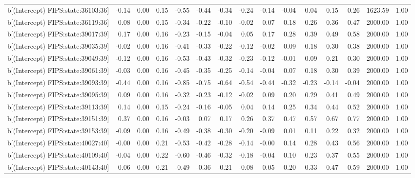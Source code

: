 \begin{table}[ht]
\begin{tabular}{rrrrrrrrrrrrrrr}
  b[(Intercept) FIPS:state:36103:36] & -0.14 & 0.00 & 0.15 & -0.55 & -0.44 & -0.34 & -0.24 & -0.14 & -0.04 & 0.04 & 0.15 & 0.26 & 1623.59 & 1.00 \\ 
  b[(Intercept) FIPS:state:36119:36] & 0.08 & 0.00 & 0.15 & -0.34 & -0.22 & -0.10 & -0.02 & 0.07 & 0.18 & 0.26 & 0.36 & 0.47 & 2000.00 & 1.00 \\ 
  b[(Intercept) FIPS:state:39017:39] & 0.17 & 0.00 & 0.16 & -0.23 & -0.15 & -0.04 & 0.05 & 0.17 & 0.28 & 0.39 & 0.49 & 0.58 & 2000.00 & 1.00 \\ 
  b[(Intercept) FIPS:state:39035:39] & -0.02 & 0.00 & 0.16 & -0.41 & -0.33 & -0.22 & -0.12 & -0.02 & 0.09 & 0.18 & 0.30 & 0.38 & 2000.00 & 1.00 \\ 
  b[(Intercept) FIPS:state:39049:39] & -0.12 & 0.00 & 0.16 & -0.53 & -0.43 & -0.32 & -0.23 & -0.12 & -0.01 & 0.09 & 0.21 & 0.30 & 2000.00 & 1.00 \\ 
  b[(Intercept) FIPS:state:39061:39] & -0.03 & 0.00 & 0.16 & -0.45 & -0.35 & -0.25 & -0.14 & -0.04 & 0.07 & 0.18 & 0.30 & 0.39 & 2000.00 & 1.00 \\ 
  b[(Intercept) FIPS:state:39093:39] & -0.44 & 0.00 & 0.16 & -0.85 & -0.75 & -0.64 & -0.54 & -0.44 & -0.32 & -0.23 & -0.14 & -0.04 & 2000.00 & 1.00 \\ 
  b[(Intercept) FIPS:state:39095:39] & 0.09 & 0.00 & 0.16 & -0.32 & -0.23 & -0.12 & -0.02 & 0.09 & 0.20 & 0.29 & 0.41 & 0.49 & 2000.00 & 1.00 \\ 
  b[(Intercept) FIPS:state:39113:39] & 0.14 & 0.00 & 0.15 & -0.24 & -0.16 & -0.05 & 0.04 & 0.14 & 0.25 & 0.34 & 0.44 & 0.52 & 2000.00 & 1.00 \\ 
  b[(Intercept) FIPS:state:39151:39] & 0.37 & 0.00 & 0.16 & -0.03 & 0.07 & 0.17 & 0.26 & 0.37 & 0.47 & 0.57 & 0.67 & 0.77 & 2000.00 & 1.00 \\ 
  b[(Intercept) FIPS:state:39153:39] & -0.09 & 0.00 & 0.16 & -0.49 & -0.38 & -0.30 & -0.20 & -0.09 & 0.01 & 0.11 & 0.22 & 0.32 & 2000.00 & 1.00 \\ 
  b[(Intercept) FIPS:state:40027:40] & -0.00 & 0.00 & 0.21 & -0.53 & -0.42 & -0.28 & -0.14 & -0.00 & 0.14 & 0.28 & 0.43 & 0.56 & 2000.00 & 1.00 \\ 
  b[(Intercept) FIPS:state:40109:40] & -0.04 & 0.00 & 0.22 & -0.60 & -0.46 & -0.32 & -0.18 & -0.04 & 0.10 & 0.23 & 0.37 & 0.55 & 2000.00 & 1.00 \\ 
  b[(Intercept) FIPS:state:40143:40] & 0.06 & 0.00 & 0.21 & -0.49 & -0.36 & -0.21 & -0.08 & 0.05 & 0.20 & 0.33 & 0.47 & 0.59 & 2000.00 & 1.00 \\ 

\end{tabular}
\end{table}
